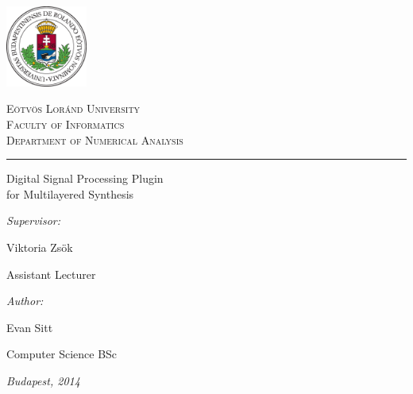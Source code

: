 \begin{titlepage}

\noindent
\parbox[m]{0.2\textwidth}{
 \includegraphics[width=0.2\textwidth]{elte_logo_color.eps} %
}
\hfill
\parbox[m]{0.7\textwidth}{
\begin{center}
\begin{large}
\textsc{
E\"otv\"os Lor\'and University\\
\vspace{0.5pc}
Faculty of Informatics\\
\vspace{0.5pc}
Department of Numerical Analysis\\
}
\end{large}
\end{center}
}

\vspace{1pc}
\hrule

\vfill

\begin{center}
{\LARGE Digital Signal Processing Plugin\\for Multilayered Synthesis}
\end{center}

\vfill

\noindent
\hspace*{0.05\textwidth}
\parbox{0.45\textwidth}{
{\it Supervisor:}
\bigskip

{\Large Viktoria Zs\"ok}
\smallskip

Assistant Lecturer
}
\hfill
\parbox{0.45\textwidth}{
{\it Author:}
\bigskip

{\Large Evan Sitt}
\smallskip

Computer Science BSc
}


\vfill

\begin{center}
{\large {\it Budapest, 2014}}
\end{center}

\end{titlepage}
